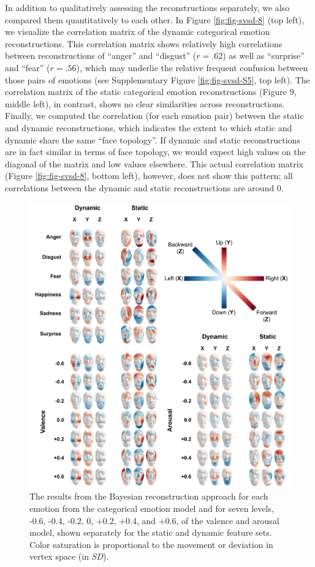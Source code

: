 \documentclass[12pt,american,a4paper,oneside,]{memoir} %
\begin{document}
In addition to qualitatively assessing the reconstructions separately, we also compared them quantitatively to each other. In Figure \ref{fig:fig-svsd-8} (top left), we visualize the correlation matrix of the dynamic categorical emotion reconstructions. This correlation matrix shows relatively high correlations between reconstructions of ``anger'' and ``disgust'' (\(r = .62\)) as well as ``surprise'' and ``fear'' (\(r = .56\)), which may underlie the relative frequent confusion between those pairs of emotions (see Supplementary Figure \ref{fig:fig-svsd-S5}, top left). The correlation matrix of the static categorical emotion reconstructions (Figure 9, middle left), in contrast, shows no clear similarities across reconstructions. Finally, we computed the correlation (for each emotion pair) between the static and dynamic reconstructions, which indicates the extent to which static and dynamic share the same ``face topology''. If dynamic and static reconstructions are in fact similar in terms of face topology, we would expect high values on the diagonal of the matrix and low values elsewhere. This actual correlation matrix (Figure \ref{fig:fig-svsd-8}, bottom left), however, does not show this pattern; all correlations between the dynamic and static reconstructions are around 0.

\begin{figure}
\centering
\includegraphics{_bookdown_files/static-vs-dynamic-files/figures/figure_7.pdf}
\caption{\label{fig:fig-svsd-7}The results from the Bayesian reconstruction approach for each emotion from the categorical emotion model and for seven levels, -0.6, -0.4, -0.2, 0, +0.2, +0.4, and +0.6, of the valence and arousal model, shown separately for the static and dynamic feature sets. Color saturation is proportional to the movement or deviation in vertex space (in \emph{SD}).}
\end{figure}
\end{document}
